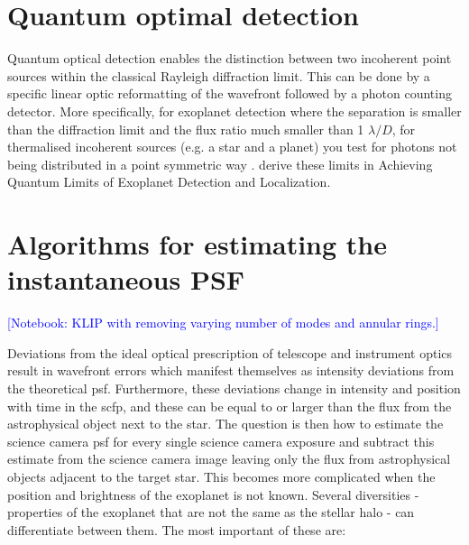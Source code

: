 \documentclass[letterpaper]{ar-1col}
\newcommand{\ld}{$\lambda/D$}
\newcommand{\notebooksuggestion}[1]{\textcolor{blue}{[Notebook: #1]}}
\begin{document}
%
%
 



\section{Quantum optimal detection}

Quantum optical detection \citep{Lu18} enables the distinction between two incoherent point sources within the classical Rayleigh diffraction limit.
%
This can be done by a specific linear optic reformatting of the wavefront followed by a photon counting detector.
%
More specifically, for exoplanet detection where the separation is smaller than the diffraction limit and the flux ratio much smaller than 1 \ld{}, for thermalised incoherent sources (e.g. a star and a planet) you test for photons not being distributed in a point symmetric way \citep[e.g. ][]{Huang21}.
%
\citet{Desai23} derive these limits in Achieving Quantum Limits of Exoplanet Detection and Localization.

\section{Algorithms for estimating the instantaneous PSF}

\notebooksuggestion{KLIP with removing varying number of modes and annular rings.}

Deviations from the ideal optical prescription of telescope and instrument optics result in wavefront errors which manifest themselves as intensity deviations from the theoretical \ac{psf}.
%
Furthermore, these deviations change in intensity and position with time in the \ac{scfp}, and these can be equal to or larger than the flux from the astrophysical object next to the star.
%
The question is then how to estimate the science camera \ac{psf} for every single science camera exposure  and subtract this estimate from the science camera image leaving only the flux from astrophysical objects adjacent to the target star.
%
This becomes more complicated when the position and brightness of the exoplanet is not known.
%
%
Several diversities - properties of the exoplanet that are not the same as the stellar halo - can differentiate between them.
%
The most important of these are:
\end{document}
